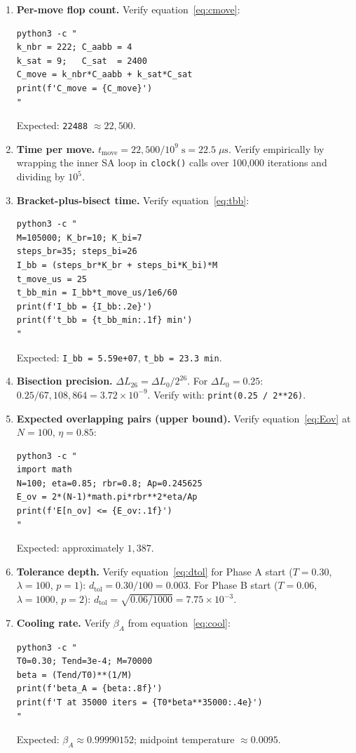\documentclass[11pt,oneside]{article}
\begin{document}
\begin{enumerate}[leftmargin=*,label=\textbf{\arabic*.}]
\item \textbf{Per-move flop count.} Verify equation~\eqref{eq:cmove}:
\begin{lstlisting}[style=bashstyle]
python3 -c "
k_nbr = 222; C_aabb = 4
k_sat = 9;   C_sat  = 2400
C_move = k_nbr*C_aabb + k_sat*C_sat
print(f'C_move = {C_move}')
"
\end{lstlisting}
Expected: \texttt{22488} $\approx 22{,}500$.

\item \textbf{Time per move.}
$t_{\mathrm{move}} = 22{,}500 / 10^9 \;\mathrm{s} = 22.5\;\mu\mathrm{s}$.
Verify empirically by wrapping the inner SA loop in \texttt{clock()}
calls over 100{,}000 iterations and dividing by $10^5$.

\item \textbf{Bracket-plus-bisect time.} Verify equation~\eqref{eq:tbb}:
\begin{lstlisting}[style=bashstyle]
python3 -c "
M=105000; K_br=10; K_bi=7
steps_br=35; steps_bi=26
I_bb = (steps_br*K_br + steps_bi*K_bi)*M
t_move_us = 25
t_bb_min = I_bb*t_move_us/1e6/60
print(f'I_bb = {I_bb:.2e}')
print(f't_bb = {t_bb_min:.1f} min')
"
\end{lstlisting}
Expected: \texttt{I\_bb = 5.59e+07}, \texttt{t\_bb = 23.3 min}.

\item \textbf{Bisection precision.}
$\Delta L_{26} = \Delta L_0 / 2^{26}$. For $\Delta L_0 = 0.25$:
$0.25 / 67{,}108{,}864 = 3.72 \times 10^{-9}$. Verify with:
\texttt{print(0.25 / 2**26)}.

\item \textbf{Expected overlapping pairs (upper bound).} Verify
equation~\eqref{eq:Eov} at $N = 100$, $\eta = 0.85$:
\begin{lstlisting}[style=bashstyle]
python3 -c "
import math
N=100; eta=0.85; rbr=0.8; Ap=0.245625
E_ov = 2*(N-1)*math.pi*rbr**2*eta/Ap
print(f'E[n_ov] <= {E_ov:.1f}')
"
\end{lstlisting}
Expected: approximately $1{,}387$.

\item \textbf{Tolerance depth.} Verify equation~\eqref{eq:dtol}
for Phase A start ($T = 0.30$, $\lambda = 100$, $p = 1$):
$d_{\mathrm{tol}} = 0.30/100 = 0.003$.
For Phase B start ($T = 0.06$, $\lambda = 1000$, $p = 2$):
$d_{\mathrm{tol}} = \sqrt{0.06/1000} = 7.75 \times 10^{-3}$.

\item \textbf{Cooling rate.} Verify $\beta_A$ from
equation~\eqref{eq:cool}:
\begin{lstlisting}[style=bashstyle]
python3 -c "
T0=0.30; Tend=3e-4; M=70000
beta = (Tend/T0)**(1/M)
print(f'beta_A = {beta:.8f}')
print(f'T at 35000 iters = {T0*beta**35000:.4e}')
"
\end{lstlisting}
Expected: $\beta_A \approx 0.99990152$; midpoint temperature
$\approx 0.0095$.


\end{enumerate}
\end{document}
